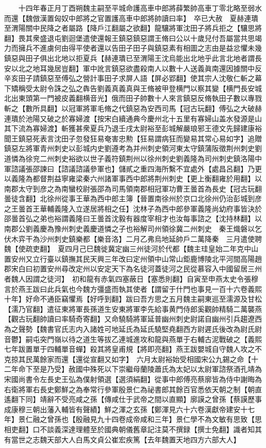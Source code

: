 　　十四年春正月丁酉朔魏主嗣至平城命護高車中郎將薛繁帥高車丁零北略至弱水而還【魏倣漢置匈奴中郎將之官置護高車中郎將帥讀曰率】　卒已大赦　夏赫連璝至渭陽關中民降之者屬路【降戶江翻屬之欲翻】龍驤將軍沈田子將兵拒之【驤思將翻】畏其衆盛退屯劉迴堡遣使還報王鎮惡鎮惡謂王脩曰公以十歲兒付吾屬當共思竭力而擁兵不進虜何由得平使者還以告田子田子與鎮惡素有相圖之志由是益忿懼未幾鎮惡與田子俱出北地以拒夏兵【赫連璝已至渭陽王沈烏能出北地乎此言北地者謂長安以北之地耳幾居豈翻】軍中訛言鎮惡欲盡殺南人以數十人送義眞南還因據關中反辛亥田子請鎮惡至傅弘之營計事田子求屏人語【屏必郢翻】使其宗人沈敬仁斬之幕下矯稱受太尉令誅之弘之犇告劉義真義真與王脩被甲登横門以察其變【横門長安城北出東頭第一門被皮義翻横音光】俄而田子帥數十人來言鎮惡反脩執田子數以專戮斬之【數所具翻】以冠軍將軍毛脩之代鎮惡為安西司馬【冠古玩翻】傅弘之大破赫連璝於池陽又破之於寡婦渡【按宋白續通典今慶州北十五里有寡婦山盖水發源是山其下流為寡婦渡】斬獲甚衆夏兵乃退壬戌太尉裕至彭城解嚴琅邪王德文先歸建康裕聞王鎮惡死表言沈田子忽發狂易奄害忠勲【狂易謂病狂而變易其常心易如字】追贈鎮惡左將軍青州刺史以彭城内史劉遵考為并州刺史領河東太守鎮蒲阪徵荆州刺史劉道憐為徐兖二州刺史裕欲以世子義符鎮荆州以徐州刺史劉義隆為司州刺史鎮洛陽中軍諮議張邵諫曰【諮議諮議參軍也】儲貳之重四海所繫不宜處外【處昌呂翻】乃更以義隆為都督荆益寧雍梁秦六州諸軍事西中郎將荆州刺史【更上衡翻雍於用翻】以南郡太守到彦之為南蠻校尉張邵為司馬領南郡相冠軍功曹王曇首為長史【冠古玩翻曇徒含翻】北徐州從事王華為西中郎主簿【晉置南徐州於京口北徐州仍治彭城到彦之王曇首王華輔義隆入立遂居將相之任】沈林子為西中郎參軍義隆尚幼府事皆決於邵曇首弘之弟也裕謂義隆曰王曇首沈毅有器度宰相才也汝每事諮之【沈持林翻】以南郡公劉義慶為豫州刺史義慶道憐之子也裕解司州領徐冀二州刺史　秦王熾磐以乞伏木弈干為沙州刺史鎮樂都【樂音洛】二月乙弗烏地延帥戶二萬降秦　三月遣使聘魏【使疏吏翻】　夏四月己巳魏徙冀定幽三州徒河於代都【魏主珪皇始二年克中山置安州又立行臺以鎮撫其民天興三年改曰定州領中山常山鉅鹿博陵北平河間高陽趙郡宋白曰初置安州尋改定州以安定天下為名徒河蓋徒河之民從慕容入中國留居三州者魏人因謂之徒河】　初和龍有赤氣四塞蔽日【塞悉則翻】自寅至申燕太史令張穆言於燕王跋曰此兵氣也今魏方彊盛而執其使者【謂留于什門也事見一百十六卷義熙十年】好命不通臣竊懼焉【好呼到翻】跋曰吾方思之五月魏主嗣東巡至濡源及甘松【濡乃官翻】遣征東將軍長孫道生安東將軍李先給事黄門侍郎奚觀帥精騎二萬襲燕【觀古玩翻帥讀曰率騎奇寄翻】又命驍騎將軍延普幽州刺史尉諾自幽州引兵趨遼西為之聲勢【魏書官氏志内入諸姓可地延氏為延氏驍堅堯翻西方尉遲氏後改為尉氏尉音鬱】嗣屯突門嶺以待之道生等拔乙連城進攻和龍與燕單于右輔古泥戰破之【義熙七年跋置單于四輔單音蟬】殺其將皇甫規【將即亮翻】燕王跋嬰城自守魏人攻之不克掠其民萬餘家而還【還從宣翻又如字】　六月太尉裕始受相國宋公九錫之命【十二年命下至是乃受】赦國中殊死以下崇繼母蘭陵蕭氏為太妃以太尉軍諮祭酒孔靖為宋國尚書令左長史王弘為僕射領選【選須絹翻】從事中郎傅亮蔡廓皆為侍中謝晦為右衛將軍右長史鄭鮮之為奉常行參軍殷景仁為祕書郎其餘百官悉依天朝之制【朝直遙翻下同】靖辭不受亮咸之孫【傳咸仕于武帝之間以直顯】廓謨之曾孫【蔡謨歷事成康穆三朝出藩入輔皆有聲績】鮮之渾之玄孫【鄭渾見六十六卷漢獻帝建安十七年】景仁融之曾孫也【殷融見九十四卷成帝咸和三年】景仁學不為文敏有思致【思相吏翻】口不談義深達理體至於國典朝儀舊章記注莫不撰録【撰士免翻】識者知其有當世之志魏天部大人白馬文貞公崔宏疾篤【去年魏置天地四方六部大人】

